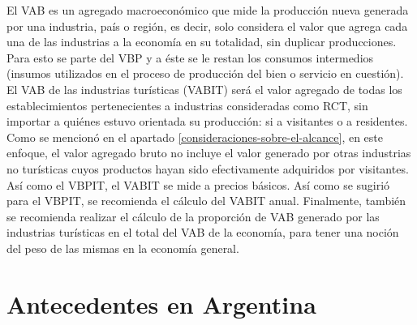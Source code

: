 \documentclass[
  openany]{book}
\begin{document}
El VAB es un agregado macroeconómico que mide la producción nueva generada por una industria, país o región, es decir, solo considera el valor que agrega cada una de las industrias a la economía en su totalidad, sin duplicar producciones. Para esto se parte del VBP y a éste se le restan los consumos intermedios (insumos utilizados en el proceso de producción del bien o servicio en cuestión). El VAB de las industrias turísticas (VABIT) será el valor agregado de todas los establecimientos pertenecientes a industrias consideradas como RCT, sin importar a quiénes estuvo orientada su producción: si a visitantes o a residentes. Como se mencionó en el apartado \ref{consideraciones-sobre-el-alcance}, en este enfoque, el valor agregado bruto no incluye el valor generado por otras industrias no turísticas cuyos productos hayan sido efectivamente adquiridos por visitantes. Así como el VBPIT, el VABIT se mide a precios básicos. Así como se sugirió para el VBPIT, se recomienda el cálculo del VABIT anual. Finalmente, también se recomienda realizar el cálculo de la proporción de VAB generado por las industrias turísticas en el total del VAB de la economía, para tener una noción del peso de las mismas en la economía general.

\hypertarget{antecedentes-en-argentina}{%
\section{Antecedentes en Argentina}\label{antecedentes-en-argentina}}
\end{document}

